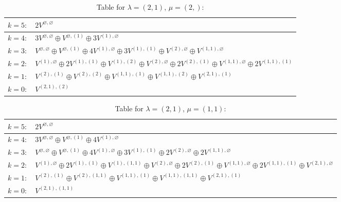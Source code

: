 \documentclass[a4paper,12pt]{article}
\begin{document}
\renewcommand{\arraystretch}{1.6} 
\begin{table}[H]
\centering
\caption{Table for $\lambda = (2, 1)$, $\mu = (2,)$:}
\begin{tabular}{|>{\centering\arraybackslash}p{15cm}|}
\hline
 $k = 5: \quad 2 V^{\varnothing, \varnothing} $ \\ \hline
 $k = 4: \quad 3 V^{\varnothing, \varnothing} \oplus V^{\varnothing, (1)} \oplus 3 V^{(1), \varnothing} $ \\ \hline
 $k = 3: \quad V^{\varnothing, \varnothing} \oplus V^{\varnothing, (1)} \oplus 4 V^{(1), \varnothing} \oplus 3 V^{(1), (1)} \oplus V^{(2), \varnothing} \oplus V^{(1, 1), \varnothing} $ \\ \hline
 $k = 2: \quad V^{(1), \varnothing} \oplus 2 V^{(1), (1)} \oplus V^{(1), (2)} \oplus V^{(2), \varnothing} \oplus 2 V^{(2), (1)} \oplus V^{(1, 1), \varnothing} \oplus 2 V^{(1, 1), (1)} $ \\ \hline
 $k = 1: \quad V^{(2), (1)} \oplus V^{(2), (2)} \oplus V^{(1, 1), (1)} \oplus V^{(1, 1), (2)} \oplus V^{(2, 1), (1)} $ \\ \hline
 $k = 0: \quad V^{(2, 1), (2)} $ \\ \hline
\end{tabular}
\end{table}

\renewcommand{\arraystretch}{1.6} 
\begin{table}[H]
\centering
\caption{Table for $\lambda = (2, 1)$, $\mu = (1, 1)$:}
\begin{tabular}{|>{\centering\arraybackslash}p{15cm}|}
\hline
 $k = 5: \quad 2 V^{\varnothing, \varnothing} $ \\ \hline
 $k = 4: \quad 3 V^{\varnothing, \varnothing} \oplus V^{\varnothing, (1)} \oplus 4 V^{(1), \varnothing} $ \\ \hline
 $k = 3: \quad V^{\varnothing, \varnothing} \oplus V^{\varnothing, (1)} \oplus 4 V^{(1), \varnothing} \oplus 3 V^{(1), (1)} \oplus 2 V^{(2), \varnothing} \oplus 2 V^{(1, 1), \varnothing} $ \\ \hline
 $k = 2: \quad V^{(1), \varnothing} \oplus 2 V^{(1), (1)} \oplus V^{(1), (1, 1)} \oplus V^{(2), \varnothing} \oplus 2 V^{(2), (1)} \oplus V^{(1, 1), \varnothing} \oplus 2 V^{(1, 1), (1)} \oplus V^{(2, 1), \varnothing} $ \\ \hline
 $k = 1: \quad V^{(2), (1)} \oplus V^{(2), (1, 1)} \oplus V^{(1, 1), (1)} \oplus V^{(1, 1), (1, 1)} \oplus V^{(2, 1), (1)} $ \\ \hline
 $k = 0: \quad V^{(2, 1), (1, 1)} $ \\ \hline
\end{tabular}
\end{table}
\end{document}
